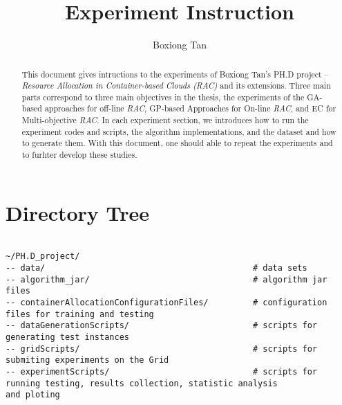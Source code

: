 \documentclass[11pt, a4paper, twoside, openright]{report}
\title{Experiment Instruction}
\author{Boxiong Tan}
\date{}
\begin{document}
\frontmatter


\begin{abstract}
  This document gives intructions to the experiments of Boxiong Tan's PH.D project -- \emph{Resource Allocation in Container-based Clouds (RAC)} and its extensions.
  Three main parts correspond to three main objectives in the thesis, 
  the experiments of the GA-based approaches for off-line \emph{RAC}, GP-based Approaches for On-line \emph{RAC},
  and EC for Multi-objective \emph{RAC}.
  In each experiment section, we introduces how to run the experiment codes and scripts, the algorithm implementations, and the dataset and how to generate them. With this document, one should able to repeat the experiments and to furhter develop these studies.
\end{abstract}


\maketitle

\tableofcontents



\mainmatter

\chapter*{Directory Tree}

\begin{lstlisting}

~/PH.D_project/
-- data/                                          # data sets
-- algorithm_jar/                                 # algorithm jar files
-- containerAllocationConfigurationFiles/         # configuration files for training and testing
-- dataGenerationScripts/                         # scripts for generating test instances
-- gridScripts/                                   # scripts for submiting experiments on the Grid
-- experimentScripts/                             # scripts for running testing, results collection, statistic analysis 
and ploting
\end{lstlisting}






\backmatter

%


\end{document}
